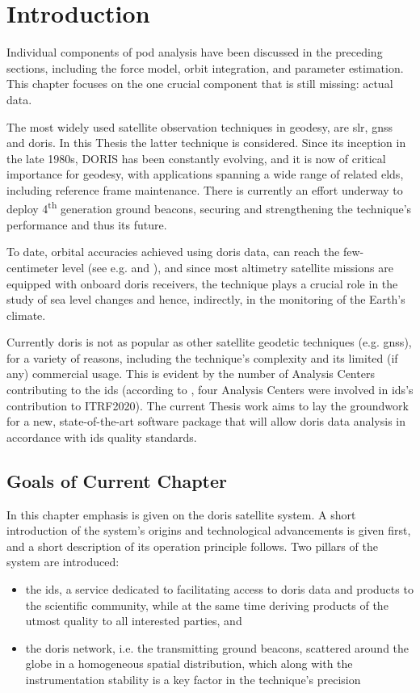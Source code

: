 \section{Introduction}\label{sec:doris-introduction}
Individual components of \gls{pod} analysis have been discussed in the preceding 
sections, including the force model, orbit integration, and parameter estimation. 
This chapter focuses on the one crucial component that is still missing: actual data.

The most widely used satellite observation techniques in geodesy, 
are \gls{slr}, \gls{gnss} and \gls{doris}. In this Thesis the latter technique 
is considered. 
Since its inception in the late 1980s, DORIS has been constantly evolving, and 
it is now of critical importance for geodesy, with applications spanning a wide 
range of related elds, including reference frame maintenance. There is currently 
an effort underway to deploy 4\textsuperscript{th} generation ground beacons, 
securing and strengthening the technique's performance and thus its future.

To date, orbital accuracies achieved using \gls{doris} data, can reach the few-centimeter 
level (see e.g. \cite{Rudenko2023} and \cite{Kong2017}), and since most altimetry satellite missions 
are equipped with onboard \gls{doris} receivers, the technique plays a crucial role in 
the study of sea level changes and hence, indirectly, in the monitoring of the Earth's 
climate.

Currently \gls{doris} is not as popular as other satellite geodetic techniques (e.g. 
\gls{gnss}), for a variety of reasons, including the technique's complexity and 
its limited (if any) commercial usage. This is evident by the number of Analysis 
Centers contributing to the \gls{ids} (according to \cite{Moreaux2022}, four Analysis Centers 
were involved in \gls{ids}'s contribution to ITRF2020). 
The current Thesis work aims to lay the groundwork for a new, state-of-the-art 
software package that will allow \gls{doris} data analysis in accordance with 
\gls{ids} quality standards.

\subsection{Goals of Current Chapter}
In this chapter emphasis is given on the \gls{doris} satellite system. A short 
introduction of the system's origins and technological advancements is given first, and a short 
description of its operation principle follows. Two pillars of the system are 
introduced: 
\begin{itemize}
  \item the \gls{ids}, a service dedicated to facilitating access to \gls{doris} 
data and products to the scientific community, while at the same time deriving products 
of the utmost quality to all interested parties, and 
  \item the \gls{doris} network, i.e. the transmitting ground beacons, scattered around the 
globe in a homogeneous spatial distribution, which along with the instrumentation stability 
is a key factor in the technique's precision
\end{itemize}

